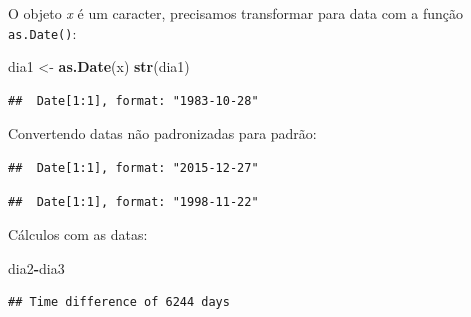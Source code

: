 \documentclass[
]{book}
\newenvironment{Shaded}{\begin{snugshade}}{\end{snugshade}}
\newcommand{\DataTypeTok}[1]{\textcolor[rgb]{0.13,0.29,0.53}{#1}}
\newcommand{\KeywordTok}[1]{\textcolor[rgb]{0.13,0.29,0.53}{\textbf{#1}}}
\newcommand{\NormalTok}[1]{#1}
\newcommand{\OperatorTok}[1]{\textcolor[rgb]{0.81,0.36,0.00}{\textbf{#1}}}
\newcommand{\StringTok}[1]{\textcolor[rgb]{0.31,0.60,0.02}{#1}}
\begin{document}
O objeto \emph{x} é um caracter, precisamos transformar para data com a função \texttt{as.Date()}:

\begin{Shaded}
\begin{Highlighting}[]
\NormalTok{dia1 <-}\StringTok{ }\KeywordTok{as.Date}\NormalTok{(x)}
\KeywordTok{str}\NormalTok{(dia1)}
\end{Highlighting}
\end{Shaded}

\begin{verbatim}
##  Date[1:1], format: "1983-10-28"
\end{verbatim}

Convertendo datas não padronizadas para padrão:

\begin{Shaded}
\end{Shaded}

\begin{verbatim}
##  Date[1:1], format: "2015-12-27"
\end{verbatim}

\begin{Shaded}
\end{Shaded}

\begin{verbatim}
##  Date[1:1], format: "1998-11-22"
\end{verbatim}

Cálculos com as datas:

\begin{Shaded}
\begin{Highlighting}[]
\NormalTok{dia2}\OperatorTok{-}\NormalTok{dia3}
\end{Highlighting}
\end{Shaded}

\begin{verbatim}
## Time difference of 6244 days
\end{verbatim}
\end{document}
